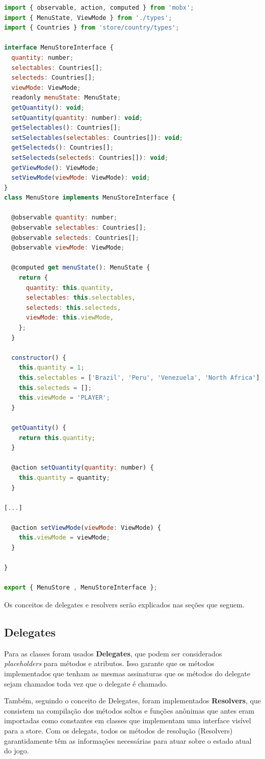 \documentclass[rel_mlp]{iiufrgs}
\begin{document}
\begin{lstlisting}[language=JavaScript]
import { observable, action, computed } from 'mobx';
import { MenuState, ViewMode } from './types';
import { Countries } from 'store/country/types';

interface MenuStoreInterface {
  quantity: number;
  selectables: Countries[];
  selecteds: Countries[];
  viewMode: ViewMode;
  readonly menuState: MenuState;
  getQuantity(): void;
  setQuantity(quantity: number): void;
  getSelectables(): Countries[];
  setSelectables(selectables: Countries[]): void;
  getSelecteds(): Countries[];
  setSelecteds(selecteds: Countries[]): void;
  getViewMode(): ViewMode;
  setViewMode(viewMode: ViewMode): void;
}
class MenuStore implements MenuStoreInterface {

  @observable quantity: number;
  @observable selectables: Countries[];
  @observable selecteds: Countries[];
  @observable viewMode: ViewMode;

  @computed get menuState(): MenuState {
    return {
      quantity: this.quantity,
      selectables: this.selectables,
      selecteds: this.selecteds,
      viewMode: this.viewMode,
    };
  }

  constructor() {
    this.quantity = 1;
    this.selectables = ['Brazil', 'Peru', 'Venezuela', 'North Africa'];
    this.selecteds = [];
    this.viewMode = 'PLAYER';
  }

  getQuantity() {
    return this.quantity;
  }

  @action setQuantity(quantity: number) {
    this.quantity = quantity;
  }

[...]

  @action setViewMode(viewMode: ViewMode) {
    this.viewMode = viewMode;
  }

}

export { MenuStore , MenuStoreInterface };
\end{lstlisting}

Os conceitos de delegates e resolvers serão explicados nas seções que seguem.


\subsection{Delegates}
Para as classes foram usados \textbf{Delegates}, que podem ser considerados \textit{placeholders} para métodos e atributos. Isso garante que os métodos implementados que tenham as mesmas assinaturas que os métodos do delegate sejam chamados toda vez que o delegate é chamado.\par
Também, seguindo o conceito de Delegates, foram implementados \textbf{Resolvers}, que consistem na compilação dos métodos soltos e funções anônimas que antes eram importadas como constantes em classes que implementam uma interface visível para a store. Com os delegats, todos os métodos de resolução (Resolvers) garantidamente têm as informações necessárias para atuar sobre o estado atual do jogo.
\end{document}
